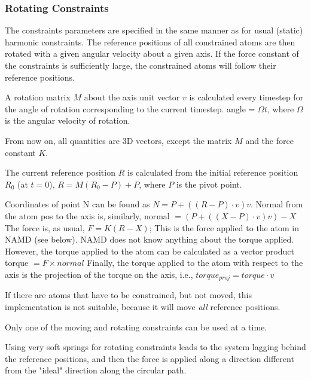 \subsubsection{Rotating Constraints}

The constraints parameters are specified in the same manner as for
usual (static) harmonic constraints. The reference positions of all
constrained atoms are then rotated with a given angular velocity
about a given axis. If the force constant of the constraints is
sufficiently
large, the constrained atoms will follow their reference positions.

A rotation matrix $M$ about the axis unit vector $v$ is calculated every
timestep
for the angle of rotation corresponding to the current timestep.
    angle = $\Omega t$,
where $\Omega$ is the angular velocity of rotation.

From now on, all quantities are 3D vectors, except the matrix $M$ and the
force constant $K$.

The current reference position $R$ is calculated from the initial
reference
position $R_0$ (at $t=0$),
    $R = M (R_0 - P) + P$,
where $P$ is the pivot point.

%
%
%

Coordinates of point N can be found as
   $N = P + ( (R - P) \cdot v ) v$.
Normal from the atom pos to the axis is, similarly,
   normal $= ( P + ( (X - P) \cdot v ) v ) - X$
The force is, as usual,
   $F = K (R - X)$;
This is the force applied to the atom in NAMD (see below).
NAMD does not know anything about the torque
applied. However, the torque applied to the atom can be calculated
as a vector product
   torque $= F \times normal$
Finally, the torque applied to the atom with respect to the axis
is the projection of the torque on the axis, i.e.,
   $torque_{proj} = torque \cdot v$

If there are atoms that have to be constrained, but not moved,
this implementation is not suitable, because it will move {\em all}
reference positions.

Only one of the moving and rotating constraints can be used at a
time.

Using very soft springs for rotating constraints leads to the system
   lagging behind the reference positions, and then the force is applied
   along a direction different from the "ideal" direction along the
   circular path.


